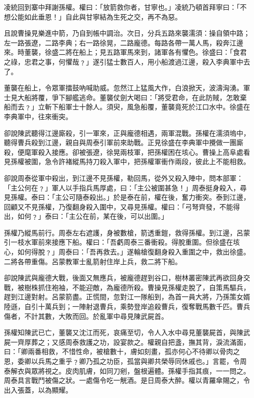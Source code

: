 凌統回到寨中拜謝孫權。權曰：「放箭救你者，甘寧也。」凌統乃頓首拜寧曰：「不想公能如此垂恩！」自此與甘寧結為生死之交，再不為惡。

且說曹操見樂進中箭，乃自到帳中調治。次日，分兵五路來襲濡須：操自領中路；左一路張遼，二路李典；右一路徐晃，二路龐德。每路各帶一萬人馬，殺奔江邊來。時董襲，徐盛二將在船上；見五路軍馬來到，諸軍各有懼色。徐盛曰：「食君之祿，忠君之事，何懼哉﹖」遂引猛士數百人，用小船渡過江邊，殺入李典軍中去了。

董襲在船上，令眾軍擂鼓吶喊助威。忽然江上猛風大作，白浪掀天，波濤洶湧。軍士見大船將覆，爭下腳艦逃命。董襲仗劍大喝曰：「將受君命，在此防賊，怎敢棄船而去﹖」立斬下船軍士十餘人。須臾，風急船覆，董襲竟死於江口水中。徐盛在李典軍中，往來衝突。

卻說陳武聽得江邊廝殺，引一軍來，正與龐德相遇，兩軍混戰。孫權在濡須塢中，聽得曹兵殺到江邊，親自與周泰引軍前來助戰。正見徐盛在李典軍中攪做一團廝殺，便麾軍殺入接應。卻被張遼，徐晃兩枝軍，把孫權困在垓心。曹操上高阜處看見孫權被圍，急令許褚縱馬持刀殺入軍中，把孫權軍衝作兩段，彼此上不能相救。

卻說周泰從軍中殺出，到江邊不見孫權，勒回馬，從外又殺入陣中，問本部軍：「主公何在﹖」軍人以手指兵馬厚處，曰：「主公被圍甚急！」周泰挺身殺入，尋見孫權。泰曰：「主公可隨泰殺出。」於是泰在前，權在後，奮力衝突。泰到江邊，回顧又不見孫權，乃復翻身殺入圍中，又尋見孫權。權曰：「弓弩齊發，不能得出，如何﹖」泰曰：「主公在前，某在後，可以出圍。」

孫權乃縱馬前行。周泰左右遮護，身被數槍，箭透重鎧，救得孫權。到江邊，呂蒙引一枝水軍前來接應下船。權曰：「吾虧周泰三番衝殺。得脫重圍。但徐盛在垓心，如何得脫﹖」周泰曰：「吾再救去。」遂輪槍復翻身殺入重圍之中，救出徐盛。二將各帶重傷。呂蒙教軍士亂箭射住岸上兵，救二將下船。

卻說陳武與龐德大戰，後面又無應兵，被龐德趕到谷口，樹林叢密陳武再欲回身交戰，被樹株抓住袍袖，不能迎敵，為龐德所殺。曹操見孫權走脫了，自策馬驅兵，趕到江邊對射。呂蒙箭盡。正慌間，忽對江一隊船到，為首一員大將，乃孫策女婿陸遜，自引十萬兵到；一陣射退曹兵，乘勢登岸追殺曹兵，復奪戰馬數千匹。曹兵傷者，不計其數，大敗而回。於亂軍中尋見陳武屍首。

孫權知陳武已亡，董襲又沈江而死，哀痛至切，令人入水中尋見董襲屍首，與陳武屍一齊厚葬之；又感周泰救護之功，設宴款之。權親自把盞，撫其背，淚流滿面，曰：「卿兩番相救，不惜性命，被槍數十，膚如刻畫，孤亦何心不待卿以骨肉之恩，委卿以兵馬之重乎﹖卿乃孤之功臣，孤當與卿共榮辱同休戚也。」言罷，令周泰解衣與眾將視之。皮肉肌膚，如同刀剜，盤根遍體。孫權手指其痕，一一問之。周泰具言戰鬥被傷之狀。一處傷令吃一觥酒。是日周泰大醉。權以青羅傘賜之，令出入張蓋，以為顯耀。

